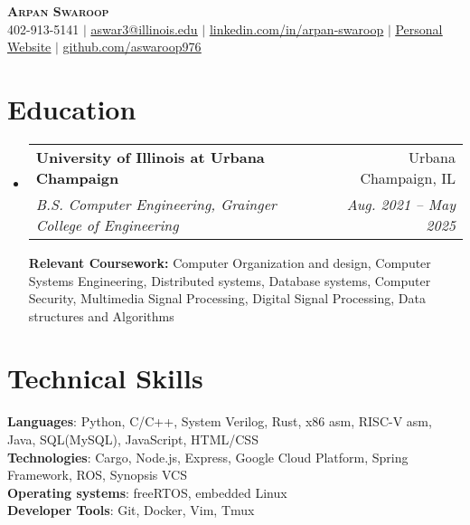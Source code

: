 \documentclass[letterpaper,10pt]{article}
\makeatletter
\newcommand{\resumeSubheading}[4]{
  \vspace{-2pt}\item
    \begin{tabular*}{0.97\textwidth}[t]{l@{\extracolsep{\fill}}r}
      \textbf{#1} & #2 \\
      \textit{\small#3} & \textit{\small #4} \\
    \end{tabular*}\vspace{-7pt}
}
\newcommand{\resumeSubHeadingListStart}{\begin{itemize}[leftmargin=0.15in, label={}, itemsep=0pt]}
\newcommand{\resumeSubHeadingListEnd}{\end{itemize}}
\makeatother
\begin{document}

\begin{center}
  \textbf{\Huge \scshape Arpan Swaroop} \\ \vspace{1pt}
  \small 402-913-5141 $|$ \href{mailto:aswar3@illinois.edu}{\underline{aswar3@illinois.edu}} $|$
  \href{https://www.linkedin.com/in/arpan-swaroop-008b04256/}{\underline{linkedin.com/in/arpan-swaroop}} $|$
  \href{https://aswaroop976.github.io/}{\underline{Personal Website}} $|$
  \href{https://github.com/aswaroop976}{\underline{github.com/aswaroop976}}
\end{center}


\section{Education}
\resumeSubHeadingListStart
\resumeSubheading
{University of Illinois at Urbana Champaign}{Urbana Champaign, IL}
{B.S. Computer Engineering, Grainger College of Engineering}{Aug. 2021 -- May 2025}
\newline
\newline
\textbf{Relevant Coursework: }Computer Organization and design, Computer Systems Engineering, Distributed systems, Database systems, Computer Security, Multimedia Signal Processing, Digital Signal Processing, Data structures and Algorithms
\resumeSubHeadingListEnd
\section{Technical Skills}
\begin{itemize}[leftmargin=0.15in, label={}]
  \small{\item{
                \textbf{Languages}{: Python, C/C++, System Verilog, Rust, x86 asm, RISC-V asm, Java, SQL(MySQL), JavaScript, HTML/CSS} \\
                \textbf{Technologies}{: Cargo, Node.js, Express, Google Cloud Platform, Spring Framework, ROS, Synopsis VCS} \\
                \textbf{Operating systems}{: freeRTOS, embedded Linux} \\
                \textbf{Developer Tools}{: Git, Docker, Vim, Tmux} \\
          }}
\end{itemize}
\end{document}
